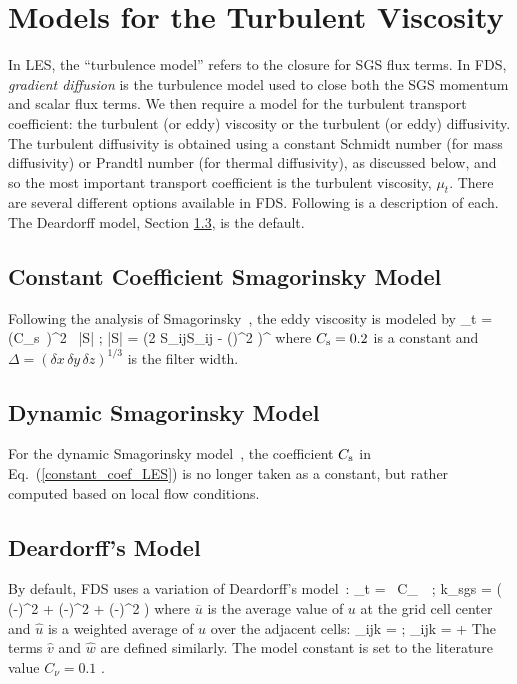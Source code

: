 \newpage
\section{Models for the Turbulent Viscosity}
\label{section:turbulent_viscosity}

In LES, the ``turbulence model'' refers to the closure for SGS flux terms.  In FDS, \emph{gradient diffusion} is the turbulence model used to close both the SGS momentum and scalar flux terms.  We then require a model for the turbulent transport coefficient: the turbulent (or eddy) viscosity or the turbulent (or eddy) diffusivity.  The turbulent diffusivity is obtained using a constant Schmidt number (for mass diffusivity) or Prandtl number (for thermal diffusivity), as discussed below, and so the most important transport coefficient is the turbulent viscosity, $\mu_t$. There are several different options available in FDS. Following is a description of each. The Deardorff model, Section \ref{sec:deardorff}, is the default.

\subsection{Constant Coefficient Smagorinsky Model}

Following the analysis of Smagorinsky~\cite{Smagorinsky:1}, the eddy viscosity is modeled by
\be
\mu_t = \rho \, (C_{\rm s}\, \Delta)^2 \, |S| \label{constant_coef_LES} \quad ; \quad |S| = \left(2 S_{ij}S_{ij} -  (\nabla\!\cdot \bu)^2 \right)^\ha
\ee
where $C_{\rm s}=0.2$ is a constant and $\Delta = (\delta x \, \delta y \, \delta z)^{1/3}$ is the filter width.

\subsection{Dynamic Smagorinsky Model}

For the dynamic Smagorinsky model~\cite{Germano:1}, the coefficient $C_{\rm s}$ in Eq.~(\ref{constant_coef_LES}) is no longer taken as a constant, but rather computed based on local flow conditions.

\subsection{Deardorff's Model}
\label{sec:deardorff}

By default, FDS uses a variation of Deardorff's model~\cite{Deardorff:1}:
\be
  \mu_{\rm t} = \rho \, C_\nu \, \Delta \,  \quad ; \quad
  k_{\rm sgs} = \ha \left( (-)^2 + (-)^2 + (-)^2 \right)  \label{Deardorff_LES}
\ee
where $\overline{u}$ is the average value of $u$ at the grid cell center and $\hat{u}$ is a weighted average of $u$ over the adjacent cells:
\be
   _{ijk} =  \quad ; \quad {}_{ijk} =  + 
\ee
The terms $\hat{v}$ and $\hat{w}$ are defined similarly.  The model constant is set to the literature value $C_\nu=0.1$ \cite{Pope:2000}.


